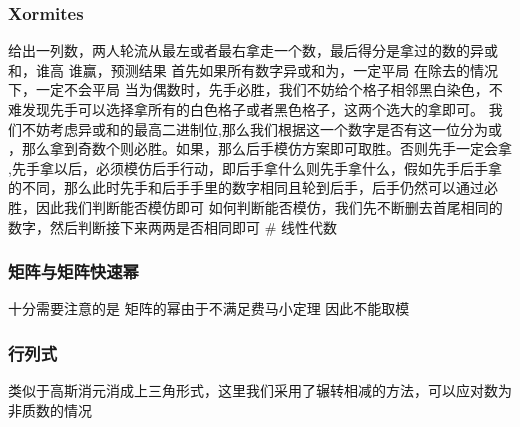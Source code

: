 \documentclass[8pt,a4paper]{article}
\newcommand{\code}[1]{
    
}
\newcommand{\txt}[1]{\par\noindent\footnotesize #1}
\newcommand{\inlineformula}[1]{\ensuremath{}}
\begin{document}
\begin{multicols}{2}
        \subsubsection{Xormites}
            \txt{给出一列数，两人轮流从最左或者最右拿走一个数，最后得分是拿过的数的异或和，谁高
谁赢，预测结果
\inlineformula{./assets/formulas_tex/formula_645.tex}首先如果所有数字异或和为\inlineformula{./assets/formulas_tex/formula_646.tex}，一定平局
\inlineformula{./assets/formulas_tex/formula_647.tex}在除去\inlineformula{./assets/formulas_tex/formula_648.tex}的情况下，一定不会平局
\inlineformula{./assets/formulas_tex/formula_649.tex}当\inlineformula{./assets/formulas_tex/formula_650.tex}为偶数时，先手必胜，我们不妨给\inlineformula{./assets/formulas_tex/formula_651.tex}个格子相邻黑白染色，不难发现先手可以选择拿所有的白色格子或者黑色格子，这两个选大的拿即可。
\inlineformula{./assets/formulas_tex/formula_652.tex}我们不妨考虑异或和\inlineformula{./assets/formulas_tex/formula_653.tex}的最高二进制位\inlineformula{./assets/formulas_tex/formula_654.tex},那么我们根据这一个数字是否有\inlineformula{./assets/formulas_tex/formula_655.tex}这一位分为\inlineformula{./assets/formulas_tex/formula_656.tex}或\inlineformula{./assets/formulas_tex/formula_657.tex}，那么拿到奇数个\inlineformula{./assets/formulas_tex/formula_658.tex}则必胜。如果\inlineformula{./assets/formulas_tex/formula_659.tex}，那么后手模仿方案\inlineformula{./assets/formulas_tex/formula_660.tex}即可取胜。否则先手一定会拿\inlineformula{./assets/formulas_tex/formula_661.tex},先手拿\inlineformula{./assets/formulas_tex/formula_662.tex}以后，必须模仿后手行动，即后手拿什么则先手拿什么，假如先手后手拿的不同，那么此时先手和后手手里的数字相同且轮到后手，后手仍然可以通过\inlineformula{./assets/formulas_tex/formula_663.tex}必胜，因此我们判断能否模仿即可
\inlineformula{./assets/formulas_tex/formula_664.tex}如何判断能否模仿\inlineformula{./assets/formulas_tex/formula_665.tex}，我们先不断删去首尾相同的数字，然后判断接下来两两是否相同即可
\# 线性代数}
        \subsubsection{矩阵与矩阵快速幂}
            \txt{十分需要注意的是 矩阵的幂由于不满足费马小定理 因此不能取模}
            \code{src/number_theory/随机化算法_11_5.cpp}
        \subsubsection{行列式}
            \txt{类似于高斯消元消成上三角形式，这里我们采用了辗转相减的方法，可以应对\inlineformula{./assets/formulas_tex/formula_666.tex}数为非质数的情况}
            \code{src/number_theory/随机化算法_12_5.cpp}

\end{multicols}
\end{document}
